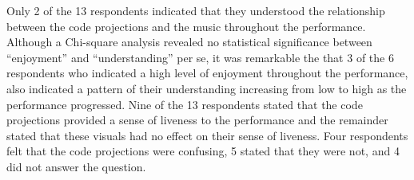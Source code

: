 \documentclass{sig-alternate}
\begin{document}



Only 2 of the 13 respondents indicated that they understood the relationship between the code projections and the music throughout the performance. Although a Chi-square analysis revealed no statistical significance between ``enjoyment'' and ``understanding'' per se, it was remarkable the that 3 of the 6 respondents who indicated a high level of enjoyment throughout the performance, also indicated a pattern of their understanding increasing from low to high as the performance progressed. Nine of the 13 respondents stated that the code projections provided a sense of liveness to the performance and the remainder stated that these visuals had no effect on their sense of liveness. Four respondents felt that the code projections were confusing, 5 stated that they were not, and 4 did not answer the question. 




\end{document}
